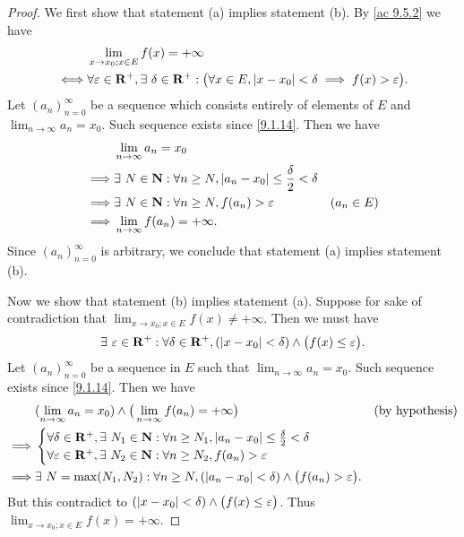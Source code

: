 \begin{proof}
  We first show that statement (a) implies statement (b).
  By \cref{ac 9.5.2} we have
  \begin{align*}
         & \lim_{x \to x_0 ; x \in E} f(x) = +\infty                                                                                               \\
    \iff & \forall \varepsilon \in \mathbf{R}^+, \exists\ \delta \in \mathbf{R}^+ : \big(\forall x \in E, \left\lvert x - x_0\right\rvert < \delta \implies f(x) > \varepsilon\big).
  \end{align*}
  Let \((a_n)_{n = 0}^\infty\) be a sequence which consists entirely of elements of \(E\) and \(\lim_{n \to \infty} a_n = x_0\).
  Such sequence exists since \cref{9.1.14}.
  Then we have
  \begin{align*}
             & \lim_{n \to \infty} a_n = x_0                                                                      \\
    \implies & \exists\ N \in \mathbf{N} : \forall n \geq N, \left\lvert a_n - x_0\right\rvert \leq \frac{\delta}{2} < \delta               \\
    \implies & \exists\ N \in \mathbf{N} : \forall n \geq N, f(a_n) > \varepsilon                           & (a_n \in E) \\
    \implies & \lim_{n \to \infty} f(a_n) = +\infty.
  \end{align*}
  Since \((a_n)_{n = 0}^\infty\) is arbitrary, we conclude that statement (a) implies statement (b).

  Now we show that statement (b) implies statement (a).
  Suppose for sake of contradiction that \(\lim_{x \to x_0 ; x \in E} f(x) \neq +\infty\).
  Then we must have
  \[
    \exists\ \varepsilon \in \mathbf{R}^+ : \forall \delta \in \mathbf{R}^+, (\left\lvert x - x_0\right\rvert < \delta) \land \big(f(x) \leq \varepsilon\big).
  \]
  Let \((a_n)_{n = 0}^\infty\) be a sequence in \(E\) such that \(\lim_{n \to \infty} a_n = x_0\).
  Such sequence exists since \cref{9.1.14}.
  Then we have
  \begin{align*}
             & (\lim_{n \to \infty} a_n = x_0) \land \big(\lim_{n \to \infty} f(a_n) = +\infty\big)                                 & \text{(by hypothesis)} \\
    \implies & \begin{cases}
                 \forall \delta \in \mathbf{R}^+, \exists\ N_1 \in \mathbf{N} : \forall n \geq N_1, \left\lvert a_n - x_0\right\rvert \leq \frac{\delta}{2} < \delta \\
                 \forall \varepsilon \in \mathbf{R}^+, \exists\ N_2 \in \mathbf{N} : \forall n \geq N_2, f(a_n) > \varepsilon
               \end{cases}                             \\
    \implies & \exists\ N = \max(N_1, N_2) : \forall n \geq N, (\left\lvert a_n - x_0\right\rvert < \delta) \land \big(f(a_n) > \varepsilon\big).
  \end{align*}
  But this contradict to \((\left\lvert x - x_0\right\rvert < \delta) \land \big(f(x) \leq \varepsilon\big)\).
  Thus \(\lim_{x \to x_0 ; x \in E} f(x) = +\infty\).
\end{proof}

